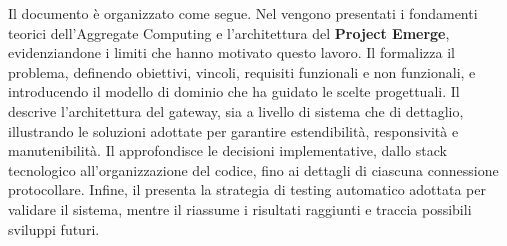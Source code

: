 Il documento è organizzato come segue. Nel  vengono presentati i fondamenti teorici dell'Aggregate Computing e l'architettura del \textbf{Project Emerge}, evidenziandone i limiti che hanno motivato questo lavoro. Il  formalizza il problema, definendo obiettivi, vincoli, requisiti funzionali e non funzionali, e introducendo il modello di dominio che ha guidato le scelte progettuali. Il  descrive l'architettura del gateway, sia a livello di sistema che di dettaglio, illustrando le soluzioni adottate per garantire estendibilità, responsività e manutenibilità. Il  approfondisce le decisioni implementative, dallo stack tecnologico all'organizzazione del codice, fino ai dettagli di ciascuna connessione protocollare. Infine, il  presenta la strategia di testing automatico adottata per validare il sistema, mentre il  riassume i risultati raggiunti e traccia possibili sviluppi futuri.
%